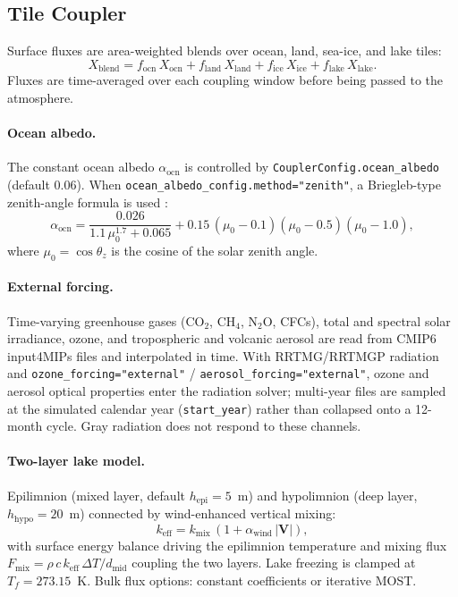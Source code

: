 \documentclass[11pt,a4paper]{article}
\begin{document}
\subsection{Tile Coupler}

Surface fluxes are area-weighted blends over ocean, land, sea-ice, and lake tiles:
\begin{equation}
  X_{\mathrm{blend}} = f_{\mathrm{ocn}}\,X_{\mathrm{ocn}} + f_{\mathrm{land}}\,X_{\mathrm{land}} + f_{\mathrm{ice}}\,X_{\mathrm{ice}} + f_{\mathrm{lake}}\,X_{\mathrm{lake}}.
\end{equation}
Fluxes are time-averaged over each coupling window before being passed to the atmosphere.

\paragraph{Ocean albedo.}
The constant ocean albedo $\alpha_{\mathrm{ocn}}$ is controlled by \texttt{CouplerConfig.ocean\_albedo} (default 0.06).  When \texttt{ocean\_albedo\_config.method="zenith"}, a Briegleb-type zenith-angle formula is used \citep{Briegleb1986}:
\begin{equation}
  \alpha_{\mathrm{ocn}} = \frac{0.026}{1.1\,\mu_0^{1.7}+0.065} + 0.15\,(\mu_0-0.1)(\mu_0-0.5)(\mu_0-1.0),
\end{equation}
where $\mu_0=\cos\theta_z$ is the cosine of the solar zenith angle.

\paragraph{External forcing.}
Time-varying greenhouse gases (CO$_2$, CH$_4$, N$_2$O, CFCs), total and spectral solar irradiance, ozone, and tropospheric and volcanic aerosol are read from CMIP6 input4MIPs files and interpolated in time.  With RRTMG/RRTMGP radiation and \texttt{ozone\_forcing="external"} / \texttt{aerosol\_forcing="external"}, ozone and aerosol optical properties enter the radiation solver; multi-year files are sampled at the simulated calendar year (\texttt{start\_year}) rather than collapsed onto a 12-month cycle.  Gray radiation does not respond to these channels.

\paragraph{Two-layer lake model.}
Epilimnion (mixed layer, default $h_{\mathrm{epi}}=5$~m) and hypolimnion (deep layer, $h_{\mathrm{hypo}}=20$~m) connected by wind-enhanced vertical mixing:
\begin{equation}
  k_{\mathrm{eff}} = k_{\mathrm{mix}}\,(1+\alpha_{\mathrm{wind}}\,|\bm V|),
\end{equation}
with surface energy balance driving the epilimnion temperature and mixing flux $F_{\mathrm{mix}}=\rho\,c\,k_{\mathrm{eff}}\,\Delta T/d_{\mathrm{mid}}$ coupling the two layers.  Lake freezing is clamped at $T_f=273.15$~K.  Bulk flux options: constant coefficients or iterative MOST.
\end{document}
